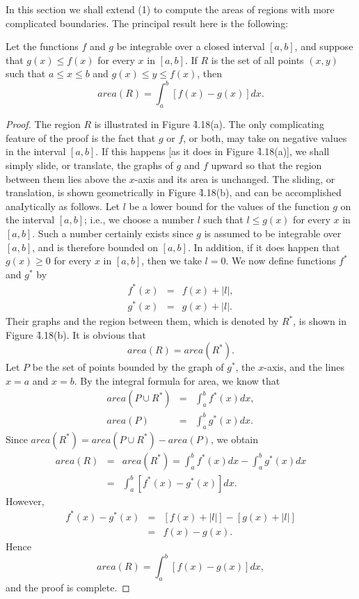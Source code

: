 In this section we shall extend (1) to compute the areas of regions with more complicated boundaries. The principal result here is the following:

\begin{theorem} %
Let the functions $f$ and $g$ be integrable over a closed interval $[a, b]$, and suppose that $g(x) \leq f(x)$ for every $x$ in $[a, b]$. If $R$ is the set of all points $(x, y)$ such that $a \leq  x \leq  b$ and $g(x) \leq  y \leq  f(x)$, then
$$
 area(R) = \int_{a}^{b} [f(x) - g(x)]dx.
$$
\end{theorem}

 
\begin{proof}
The region $R$ is illustrated in Figure \f{4.18}(a). The only complicating feature of the proof is the fact that $g$ or $f$, or both, may take on negative values in the interval $[a, b]$. If this happens [as it does in Figure \f{4.18}(a)], we shall simply slide, or translate, the graphs of $g$ and $f$ upward so that the region between them lies above the $x$-axis and its area is unchanged. The sliding, or translation, is shown geometrically in Figure \f{4.18}(b), and can be accomplished anaIytically as follows. Let $l$ be a lower bound for the values of the function $g$ on the interval $[a, b]$; i.e., we choose a number $l$ such that $l \leq g(x)$ for every $x$ in $[a, b]$. Such a number certainly exists since $g$ is assumed to be integrable over $[a, b]$, and is therefore bounded on $[a, b]$. In addition, if it does happen that $g(x) \geq 0$ for every $x$ in $[a, b]$, then we take $l = 0$. We now define functions $f^{*}$ and $g^{*}$ by
\begin{eqnarray*}
f^{*}(x) &=& f(x) + |l|, \\
g^{*}(x) &=& g(x) + |l|. 
\end{eqnarray*}
Their graphs and the region between them, which is
denoted by $R^{*}$, is shown in Figure \f{4.18}(b). It is obvious that
$$
area(R) = area(R^*).
$$
Let $P$ be the set of points bounded by the graph of $g^{*}$, the $x$-axis, and the lines $x = a$ and $x = b$.
By the integral formula for area, we know that  
\begin{eqnarray*}
area(P \cup R^{*}) &=& \int_{a}^{b} f^{*}(x) dx,\\
           area(P) &=& \int_{a}^{b} g^{*}(x) dx.
\end{eqnarray*}
Since $area(R^{*}) = area(P \cup R^{*}) - area(P)$, we obtain
\begin{eqnarray*}
area(R) &=& area(R^{*}) = \int_{a}^{b} f^{*}(x) dx - \int_{a}^{b} g^{*}(x) dx  \\
        &=& \int_{a}^{b} [f^{*}(x) - g^{*}(x)]dx.
\end{eqnarray*}
However, 
\begin{eqnarray*}
f^{*}(x) - g^{*}(x) &=& [f(x) + |l| ] - [g(x) + |l| ] \\
                    &=& f(x) - g(x).
\end{eqnarray*}
Hence
$$
area(R) = \int_{a}^{b} [f(x) - g(x)] dx, 
$$
and the proof is complete.
\end{proof}

